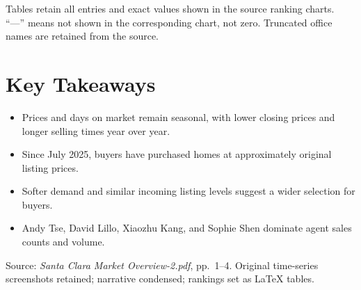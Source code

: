 \documentclass[10pt,letterpaper]{article}
\begin{document}
{\fontsize{8}{9.5}\selectfont\color{muted}
Tables retain all entries and exact values shown in the source ranking charts. ``---'' means not shown in the corresponding chart, not zero. Truncated office names are retained from the source.\par}

\vfill
\section*{Key Takeaways}
\begin{itemize}
\item Prices and days on market remain seasonal, with lower closing prices and longer selling times year over year.
\item Since July 2025, buyers have purchased homes at approximately original listing prices.
\item Softer demand and similar incoming listing levels suggest a wider selection for buyers.
\item Andy Tse, David Lillo, Xiaozhu Kang, and Sophie Shen dominate agent sales counts and volume.
\end{itemize}
\vspace{5pt}
{\fontsize{8}{9.5}\selectfont\color{muted}
Source: \textit{Santa Clara Market Overview-2.pdf}, pp.~1--4. Original time-series screenshots retained; narrative condensed; rankings set as LaTeX tables.\par}
\end{document}
